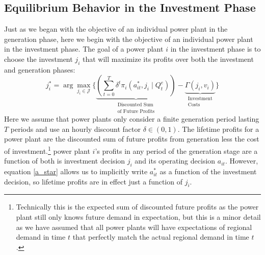 \subsection{Equilibrium Behavior in the Investment Phase}

Just as we began with the objective of an individual power plant in the generation phase, here we begin with the objective of an individual power plant in the investment phase. The goal of a power plant $i$ in the investment phase is to choose the investment $j_i$ that will maximize its profits over both the investment and generation phases:
\begin{equation}
    j_i^* = \arg\max_{j_i \in \mathcal{J}} \biggl\{ \underbrace{\left(\sum_{t = 0}^T \delta^t \pi_i (a_{it}^*, j_i\mid Q_t^e) \right)}_{\substack{\text{Discounted Sum}\\ \text{of Future Profits}}} - \underbrace{\Gamma(j_i, v_i)}_{\substack{\text{Investment}\\ \text{Costs}}} \biggr\}
\end{equation}
Here we assume that power plants only consider a finite generation period lasting $T$ periods and use an hourly discount factor $\delta \in (0, 1)$. The lifetime profits for a power plant are the discounted sum of future profits from generation less the cost of investment.\footnote{Technically this is the expected sum of discounted future profits as the power plant still only knows future demand in expectation, but this is a minor detail as we have assumed that all power plants will have expectations of regional demand in time $t$ that perfectly match the actual regional demand in time $t$.} power plant $i$'s profits in any period of the generation stage are a function of both is investment decision $j_i$ and its operating decision $a_{it}$. However, equation \eqref{a_star} allows us to implicitly write $a_{it}^*$ as a function of the investment decision, so lifetime profits are in effect just a function of $j_i$. 

